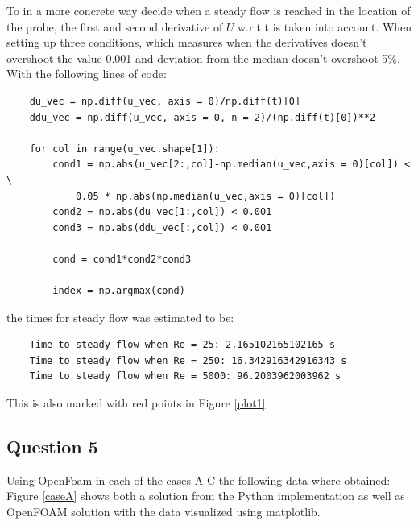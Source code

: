 \documentclass[10pt]{report}
\begin{document}
To in a more concrete way decide when a steady flow is reached in the location of the probe, the first and second derivative
of $U$ w.r.t t is taken into account. When setting up three conditions, which measures when the derivatives
doesn't overshoot the value 0.001 and deviation from the median doesn't overshoot 5\%. With the following lines of code:
\begin{lstlisting}
    du_vec = np.diff(u_vec, axis = 0)/np.diff(t)[0]
    ddu_vec = np.diff(u_vec, axis = 0, n = 2)/(np.diff(t)[0])**2

    for col in range(u_vec.shape[1]):
        cond1 = np.abs(u_vec[2:,col]-np.median(u_vec,axis = 0)[col]) < \
            0.05 * np.abs(np.median(u_vec,axis = 0)[col])
        cond2 = np.abs(du_vec[1:,col]) < 0.001
        cond3 = np.abs(ddu_vec[:,col]) < 0.001

        cond = cond1*cond2*cond3

        index = np.argmax(cond)
\end{lstlisting}
the times for steady flow was estimated to be:
\begin{lstlisting}
    Time to steady flow when Re = 25: 2.165102165102165 s
    Time to steady flow when Re = 250: 16.342916342916343 s
    Time to steady flow when Re = 5000: 96.2003962003962 s
\end{lstlisting}
This is also marked with red points in Figure \ref{plot1}.
\subsection*{Question 5}
Using OpenFoam in each of the cases A-C the following data where obtained: Figure \ref{caseA} shows
both a solution from the Python implementation as well as OpenFOAM solution with the data visualized using matplotlib.
\end{document}
